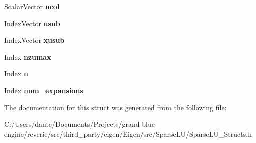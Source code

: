 \begin{DoxyCompactItemize}
Scalar\+Vector {\bfseries ucol}
\item 
\mbox{\label{struct_eigen_1_1internal_1_1_l_u___global_l_u__t_a16dc1f0c4a71bf3b3103a5904b78315e}} 
Index\+Vector {\bfseries usub}
\item 
\mbox{\label{struct_eigen_1_1internal_1_1_l_u___global_l_u__t_a7cd8881255f436f03f884a906a518629}} 
Index\+Vector {\bfseries xusub}
\item 
\mbox{\label{struct_eigen_1_1internal_1_1_l_u___global_l_u__t_a439ab1e27ba17b4927400fa3d267d7d6}} 
Index {\bfseries nzumax}
\item 
\mbox{\label{struct_eigen_1_1internal_1_1_l_u___global_l_u__t_ac98d9456d96233aee164a89ad28a06cb}} 
Index {\bfseries n}
\item 
\mbox{\label{struct_eigen_1_1internal_1_1_l_u___global_l_u__t_a60a04e15aa2821a3a2a50fd6c1683957}} 
Index {\bfseries num\+\_\+expansions}
\end{DoxyCompactItemize}


The documentation for this struct was generated from the following file\+:\begin{DoxyCompactItemize}
\item 
C\+:/\+Users/dante/\+Documents/\+Projects/grand-\/blue-\/engine/reverie/src/third\+\_\+party/eigen/\+Eigen/src/\+Sparse\+L\+U/Sparse\+L\+U\+\_\+\+Structs.\+h\end{DoxyCompactItemize}
